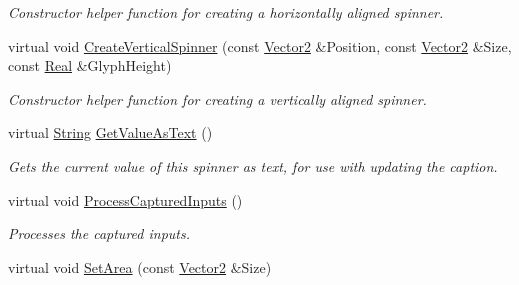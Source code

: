 \begin{DoxyCompactItemize}
\begin{DoxyCompactList}\small\item\em Constructor helper function for creating a horizontally aligned spinner. \item\end{DoxyCompactList}\item 
\hypertarget{classphys_1_1UI_1_1Spinner_aea2fe91287c9757abb6758a9b0c129cb}{
virtual void \hyperlink{classphys_1_1UI_1_1Spinner_aea2fe91287c9757abb6758a9b0c129cb}{CreateVerticalSpinner} (const \hyperlink{classphys_1_1Vector2}{Vector2} \&Position, const \hyperlink{classphys_1_1Vector2}{Vector2} \&Size, const \hyperlink{namespacephys_af7eb897198d265b8e868f45240230d5f}{Real} \&GlyphHeight)}
\label{classphys_1_1UI_1_1Spinner_aea2fe91287c9757abb6758a9b0c129cb}

\begin{DoxyCompactList}\small\item\em Constructor helper function for creating a vertically aligned spinner. \item\end{DoxyCompactList}\item 
\hypertarget{classphys_1_1UI_1_1Spinner_ac9cc6fde628120156d187b9d283579be}{
virtual \hyperlink{namespacephys_aa03900411993de7fbfec4789bc1d392e}{String} \hyperlink{classphys_1_1UI_1_1Spinner_ac9cc6fde628120156d187b9d283579be}{GetValueAsText} ()}
\label{classphys_1_1UI_1_1Spinner_ac9cc6fde628120156d187b9d283579be}

\begin{DoxyCompactList}\small\item\em Gets the current value of this spinner as text, for use with updating the caption. \item\end{DoxyCompactList}\item 
\hypertarget{classphys_1_1UI_1_1Spinner_acefea149af0d9e9afa06cd5f5559a546}{
virtual void \hyperlink{classphys_1_1UI_1_1Spinner_acefea149af0d9e9afa06cd5f5559a546}{ProcessCapturedInputs} ()}
\label{classphys_1_1UI_1_1Spinner_acefea149af0d9e9afa06cd5f5559a546}

\begin{DoxyCompactList}\small\item\em Processes the captured inputs. \item\end{DoxyCompactList}\item 
\hypertarget{classphys_1_1UI_1_1Spinner_a79840ed511ddc21d4281dc145504916e}{
virtual void \hyperlink{classphys_1_1UI_1_1Spinner_a79840ed511ddc21d4281dc145504916e}{SetArea} (const \hyperlink{classphys_1_1Vector2}{Vector2} \&Size)}
\label{classphys_1_1UI_1_1Spinner_a79840ed511ddc21d4281dc145504916e}


\end{DoxyCompactItemize}
